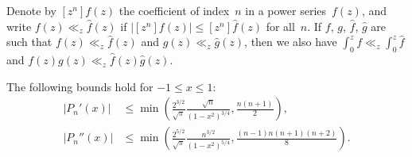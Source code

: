 \documentclass{siamart0216}
\begin{document}
\begin{lemma} \label{lemma:majorants}
Denote by $[z^n] f(z)$ the coefficient of index $n$ in a power
series $f(z)$, and write $f(z) \ll_z \hat f(z)$ if
$| [z^n] f(z) | \leq [z^n] \hat f(z)$ for all $n$.
If $f$, $g$, $\hat f$, $\hat g$ are such that
$f(z) \ll_z \hat f(z)$ and $g(z) \ll_z \hat g(z)$, then we also have
$\int_0^z f \ll_z \int_0^z \hat f$ and
$f(z)g(z) \ll_z \hat f(z) \hat g(z)$.
\end{lemma}

\begin{proposition} \label{prop:prop-bound}
The following bounds hold for $-1 \leq x \leq 1$:
\begin{align}
\label{eq:prop-bound}
  |P_n'(x)| &\le \min\left(
      \frac{2^{3/2}}{\sqrt{\pi}} \frac{\sqrt n}{(1-x^2)^{3/4}},
      \frac{n(n+1)}{2}
  \right), \\
\label{eq:prop-bound1}
  |P_n''(x)|
  &\le \min\left(
      \frac{2^{5/2}}{\sqrt{\pi}} \frac{n^{3/2}}{(1-x^2)^{5/4}},
      \frac{(n-1) n (n+1) (n+2)}{8}
  \right).
\end{align}
\end{proposition}
\end{document}
